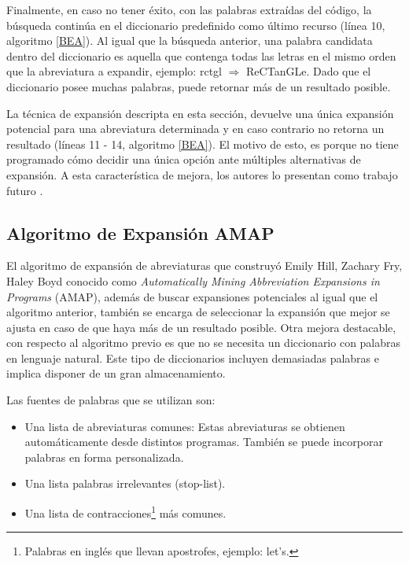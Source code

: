 Finalmente, en caso no tener éxito, con las palabras extraídas del código, la búsqueda continúa en el diccionario predefinido como último recurso (línea 10, algoritmo \ref{BEA}). Al igual que la búsqueda anterior, una palabra candidata dentro del diccionario es aquella que contenga todas las letras en el mismo orden que la abreviatura a expandir, ejemplo: \mbox{\textsf{rctgl}} $\Rightarrow$ R\textsf{e}CT\textsf{an}GL\textsf{e}. Dado que el diccionario posee muchas palabras, puede retornar más de un resultado posible.

La técnica de expansión descripta en esta sección, devuelve una única expansión potencial para una abreviatura determinada y en caso contrario no retorna un resultado (líneas 11 - 14, algoritmo \ref{BEA}). El motivo de esto, es porque no tiene programado cómo decidir una única opción ante múltiples alternativas de expansión. A esta característica de mejora, los autores lo presentan como trabajo futuro \cite{LFBEX07,EZH08}.

\subsection{Algoritmo de Expansión AMAP}
\label{sec:algAmap}

El algoritmo de expansión de abreviaturas que construyó Emily Hill, Zachary Fry, Haley Boyd \cite{EZH08} conocido como \textit{Automatically Mining Abbreviation Expansions in Programs} (AMAP), además de buscar expansiones potenciales al igual que el algoritmo anterior, también se encarga de seleccionar la expansión que mejor se ajusta en caso de que haya más de un resultado posible. Otra mejora destacable, con respecto al algoritmo previo es que no se necesita un diccionario con palabras en lenguaje natural. Este tipo de diccionarios incluyen demasiadas palabras e implica disponer de un gran almacenamiento. 

Las fuentes de palabras que se utilizan son:
\begin{itemize}
\itemsep0em%
\item Una lista de abreviaturas comunes: Estas abreviaturas se obtienen automáticamente desde distintos programas. También se puede incorporar palabras en forma personalizada.
\item Una lista palabras irrelevantes (stop-list).
\item Una lista de contracciones\footnote[1]{Palabras en inglés que llevan apostrofes, ejemplo: let's.} más comunes.
\end{itemize}

